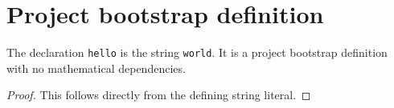 
\chapter{Project bootstrap definition}
\label{ch:IPhO2026Run_Basic}

\begin{definition}
  \label{def:project:hello}
  The declaration \texttt{hello} is the string \texttt{world}.  It is a
  project bootstrap definition with no mathematical dependencies.
\end{definition}
\begin{proof}

\leanok
  This follows directly from the defining string literal.
\end{proof}
